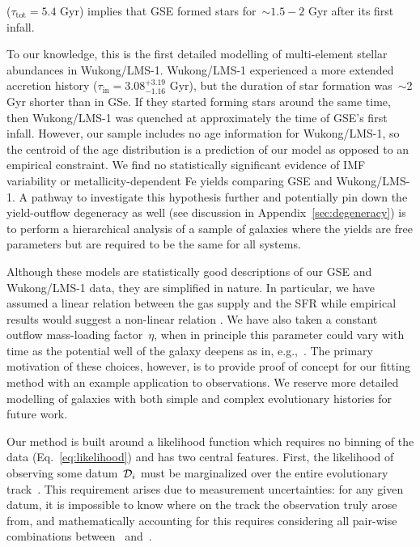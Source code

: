 \documentclass[ms.tex]{subfiles}
\begin{document}
($\tau_\text{tot} = 5.4$ Gyr) implies that GSE formed stars for~$\sim$$1.5 - 2$
Gyr after its first infall.
\par
To our knowledge, this is the first detailed modelling of multi-element stellar
abundances in Wukong/LMS-1.
Wukong/LMS-1 experienced a more extended accretion history
($\tau_\text{in} = 3.08^{+3.19}_{-1.16}$ Gyr), but the duration of star
formation was~$\sim$2 Gyr shorter than in GSe.
If they started forming stars around the same time, then Wukong/LMS-1 was
quenched at approximately the time of GSE's first infall.
However, our sample includes no age information for Wukong/LMS-1, so the
centroid of the age distribution is a prediction of our model as opposed to an
empirical constraint.
We find no statistically significant evidence of IMF variability or
metallicity-dependent Fe yields comparing GSE and Wukong/LMS-1.
A pathway to investigate this hypothesis further and potentially pin down the
yield-outflow degeneracy as well (see discussion in
Appendix~\ref{sec:degeneracy}) is to perform a hierarchical analysis of a
sample of galaxies where the yields are free parameters but are required to be
the same for all systems.
\par
Although these models are statistically good descriptions of our GSE and
Wukong/LMS-1 data, they are simplified in nature.
In particular, we have assumed a linear relation between the gas supply and the
SFR while empirical results would suggest a non-linear relation
\citep[e.g.,][]{Kennicutt1998, Kennicutt2012, delosReyes2019, Kennicutt2021}.
We have also taken a constant outflow mass-loading factor~$\eta$, when in
principle this parameter could vary with time as the potential well of the
galaxy deepens as in, e.g.,~\citet{Conroy2022}.
The primary motivation of these choices, however, is to provide proof of
concept for our fitting method with an example application to observations.
We reserve more detailed modelling of galaxies with both simple and complex
evolutionary histories for future work.
\par
Our method is built around a likelihood function which requires no binning of
the data (Eq.~\ref{eq:likelihood}) and has two central features.
First, the likelihood of observing some datum~$\script{D}_i$ must be
marginalized over the entire evolutionary track~.
This requirement arises due to measurement uncertainties: for any given datum,
it is impossible to know where on the track the observation truly arose from,
and mathematically accounting for this requires considering all pair-wise
combinations between~ and~.
$$
\end{document}
